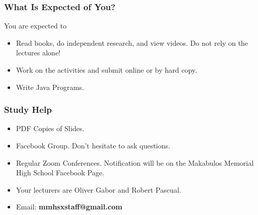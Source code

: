 \documentclass[12pt,aspectratio=169]{beamer}
\begin{document}
\begin{frame}
\frametitle{What Is Expected of You?}\large

You are expected to

\begin{itemize}
\setlength\itemsep{0.2in}
\item Read books, do independent research, and view videos.
Do not rely on the lectures alone!
\item Work on the activities and submit online or by hard copy.
\item Write Java Programs.

\end{itemize}
\end{frame}

\begin{frame}
\frametitle{Study Help}\large

\begin{itemize}
\setlength\itemsep{0.2in}
\item PDF Copies of Slides.
\item Facebook Group. Don't hesitate to ask questions.
\item Regular Zoom Conferences. Notification will be on
      the Makabulos Memorial High School Facebook Page.
\item Your lecturers are Oliver Gabor and Robert Pascual.
\item Email: \textbf{mmhsxstaff@gmail.com}
\end{itemize}
\end{frame}
\end{document}
